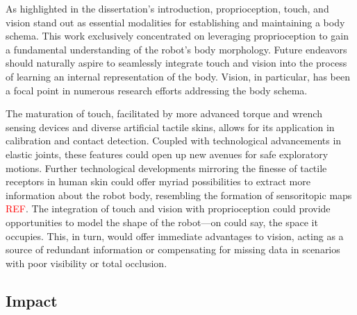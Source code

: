 \documentclass[12pt, a4paper]{article}
\newcommand{\redtext}[1]{\textcolor{red}{#1}}
\begin{document}
As highlighted in the dissertation's introduction, proprioception, touch, and vision stand out as essential modalities for establishing and maintaining a body schema. This work exclusively concentrated on leveraging proprioception to gain a fundamental understanding of the robot's body morphology. Future endeavors should naturally aspire to seamlessly integrate touch and vision into the process of learning an internal representation of the body. Vision, in particular, has been a focal point in numerous research efforts addressing the body schema.

The maturation of touch, facilitated by more advanced torque and wrench sensing devices and diverse artificial tactile skins, allows for its application in calibration and contact detection. Coupled with technological advancements in elastic joints, these features could open up new avenues for safe exploratory motions. Further technological developments mirroring the finesse of tactile receptors in human skin could offer myriad possibilities to extract more information about the robot body, resembling the formation of sensoritopic maps \redtext{REF}. The integration of touch and vision with proprioception could provide opportunities to model the shape of the robot---on could say, the space it occupies. This, in turn, would offer immediate advantages to vision, acting as a source of redundant information or compensating for missing data in scenarios with poor visibility or total occlusion.



\subsection*{Impact}
\end{document}
